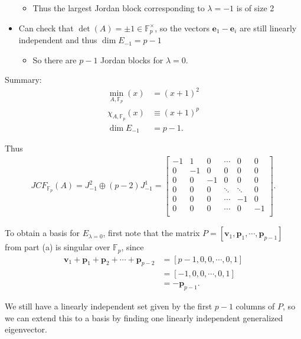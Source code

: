 \begin{solution}
\begin{itemize}
  \begin{itemize}
  \tightlist
  \item
    Thus the largest Jordan block corresponding to \(\lambda = -1\) is
    of size 2
  \end{itemize}
\item
  Can check that \(\det(A) = \pm 1 \in {\mathbb{F}}_p^{\times}\), so the
  vectors \(\mathbf{e}_1 - \mathbf{e}_i\) are still linearly independent
  and thus \(\dim E_{-1} = p-1\)

  \begin{itemize}
  \tightlist
  \item
    So there are \(p-1\) Jordan blocks for \(\lambda = 0\).
  \end{itemize}
\end{itemize}

Summary:
\begin{align*}
\min_{A, {\mathbb{F}}_p}(x) &= (x+1)^2 \\
\chi_{A, {\mathbb{F}}_p}(x) &\equiv (x+1)^p \\
\dim E_{-1} &= p-1
.\end{align*}

Thus
\begin{align*}
JCF_{{\mathbb{F}}_p}(A)
=  J_{-1}^{2} \oplus (p-2)J_{-1}^1
= \left[\begin{array}{rr|r|r|r|r}
-1 & 1 & 0 & \cdots & 0 & 0 \\
0& -1 & 0 & 0 & 0 & 0 \\
\hline
0& 0 & -1 & 0 & 0 & 0 \\ \hline
0& 0 & 0 & \ddots & \ddots & 0 \\ \hline
0& 0 & 0 & \cdots & -1 & 0 \\ \hline
0& 0 & 0 & \cdots & 0 & -1 \\
\end{array}\right]
.\end{align*}

To obtain a basis for \(E_{\lambda = 0}\), first note that the matrix
\(P = [\mathbf{v}_1, \mathbf{p}_1, \cdots , \mathbf{p}_{p-1}]\) from
part (a) is singular over \({\mathbb{F}}_p\), since
\begin{align*}
\mathbf{v}_1 + \mathbf{p}_1 + \mathbf{p}_2 + \cdots + \mathbf{p}_{p-2}
&= [p-1, 0, 0, \cdots, 0, 1] \\
&= [-1, 0,0,\cdots, 0, 1] \\
&= - \mathbf{p}_{p-1}
.\end{align*}

We still have a linearly independent set given by the first \(p-1\)
columns of \(P\), so we can extend this to a basis by finding one
linearly independent generalized eigenvector.


\end{solution}
